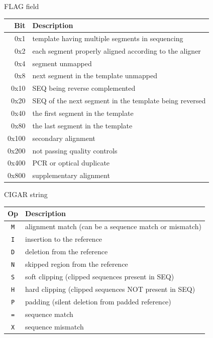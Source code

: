 \documentclass{beamer}
\begin{document}
\begin{frame}{FLAG field}
  \begin{tabular}{rl}
    \hline
    Bit & Description\\
    \hline
    0x1 &  template having multiple segments in sequencing \\
    0x2 &  each segment properly aligned according to the aligner \\
    0x4 &  segment unmapped \\
    0x8 &  next segment in the template unmapped \\
    0x10 &  {\sf SEQ} being reverse complemented \\
    0x20 &  {\sf SEQ} of the next segment in the template being reversed \\
    0x40 &  the first segment in the template \\
    0x80 &  the last segment in the template \\
    0x100 &  secondary alignment \\
    0x200 &  not passing quality controls \\
    0x400 &  PCR or optical duplicate \\
    0x800 &  supplementary alignment \\
    \hline
  \end{tabular}
\end{frame}

\begin{frame}{CIGAR string}
  \begin{tabular}{cl}
  \hline
  Op & Description\\
  \hline
  {\tt M} & alignment match (can be a sequence match or mismatch)\\
  {\tt I} & insertion to the reference \\
  {\tt D} & deletion from the reference \\
  {\tt N} & skipped region from the reference \\
  {\tt S} & soft clipping (clipped sequences present in {\sf SEQ})\\
  {\tt H} & hard clipping (clipped sequences NOT present in {\sf SEQ})\\
  {\tt P} & padding (silent deletion from padded reference)\\
  {\tt =} & sequence match \\
  {\tt X} & sequence mismatch \\
  \hline
  \end{tabular}
\end{frame}
\end{document}
